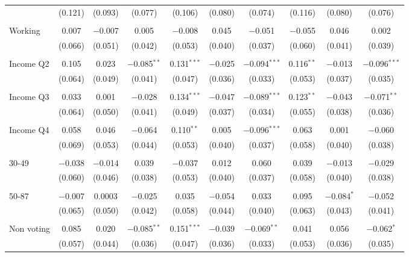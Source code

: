 \begin{tabular}{@{\extracolsep{5pt}}lccccccccc}
  & (0.121) & (0.093) & (0.077) & (0.106) & (0.080) & (0.074) & (0.116) & (0.080) & (0.076) \\ 
  & & & & & & & & & \\ 
 Working & 0.007 & $-$0.007 & 0.005 & $-$0.008 & 0.045 & $-$0.051 & $-$0.055 & 0.046 & 0.002 \\ 
  & (0.066) & (0.051) & (0.042) & (0.053) & (0.040) & (0.037) & (0.060) & (0.041) & (0.039) \\ 
  & & & & & & & & & \\ 
 Income Q2 & 0.105 & 0.023 & $-$0.085$^{**}$ & 0.131$^{***}$ & $-$0.025 & $-$0.094$^{***}$ & 0.116$^{**}$ & $-$0.013 & $-$0.096$^{***}$ \\ 
  & (0.064) & (0.049) & (0.041) & (0.047) & (0.036) & (0.033) & (0.053) & (0.037) & (0.035) \\ 
  & & & & & & & & & \\ 
 Income Q3 & 0.033 & 0.001 & $-$0.028 & 0.134$^{***}$ & $-$0.047 & $-$0.089$^{***}$ & 0.123$^{**}$ & $-$0.043 & $-$0.071$^{**}$ \\ 
  & (0.064) & (0.050) & (0.041) & (0.049) & (0.037) & (0.034) & (0.055) & (0.038) & (0.036) \\ 
  & & & & & & & & & \\ 
 Income Q4 & 0.058 & 0.046 & $-$0.064 & 0.110$^{**}$ & 0.005 & $-$0.096$^{***}$ & 0.063 & 0.001 & $-$0.060 \\ 
  & (0.069) & (0.053) & (0.044) & (0.053) & (0.040) & (0.037) & (0.058) & (0.040) & (0.038) \\ 
  & & & & & & & & & \\ 
 30-49 & $-$0.038 & $-$0.014 & 0.039 & $-$0.037 & 0.012 & 0.060 & 0.039 & $-$0.013 & $-$0.029 \\ 
  & (0.060) & (0.046) & (0.038) & (0.053) & (0.040) & (0.037) & (0.058) & (0.040) & (0.038) \\ 
  & & & & & & & & & \\ 
 50-87 & $-$0.007 & 0.0003 & $-$0.025 & 0.035 & $-$0.054 & 0.033 & 0.095 & $-$0.084$^{*}$ & $-$0.052 \\ 
  & (0.065) & (0.050) & (0.042) & (0.058) & (0.044) & (0.040) & (0.063) & (0.043) & (0.041) \\ 
  & & & & & & & & & \\ 
 Non voting & 0.085 & 0.020 & $-$0.085$^{**}$ & 0.151$^{***}$ & $-$0.039 & $-$0.069$^{**}$ & 0.041 & 0.056 & $-$0.062$^{*}$ \\ 
  & (0.057) & (0.044) & (0.036) & (0.047) & (0.036) & (0.033) & (0.053) & (0.036) & (0.035) \\ 

\end{tabular}
